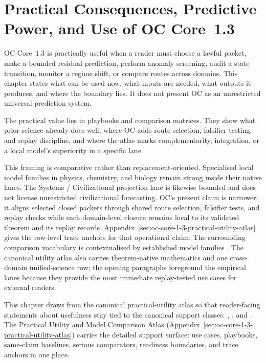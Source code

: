 \section{Practical Consequences, Predictive Power, and Use of OC Core~1.3}
\label{sec:oc-core-1-3-practical-utility}

OC Core~1.3 is practically useful when a reader must choose a lawful packet,
make a bounded residual prediction, perform anomaly screening, audit a state
transition, monitor a regime shift, or compare routes across domains. This
chapter states what can be used now, what inputs are needed, what outputs it
produces, and where the boundary lies. It does not present OC as an
unrestricted universal prediction system.

The practical value lies in playbooks and comparison matrices. They show what
prior science already does well, where OC adds route selection, falsifier
testing, and replay discipline, and where the atlas marks complementarity,
integration, or a local model's superiority in a specific lane.

This framing is comparative rather than replacement-oriented. Specialised
local model families in physics, chemistry, and biology remain strong inside
their native lanes. The Systems / Civilizational projection lane is likewise
bounded and does not license unrestricted civilizational forecasting. OC's
present claim is narrower: it aligns selected closed packets through shared
route selection, falsifier tests, and replay checks while each domain-level
closure remains local to its validated theorem and its replay records.
Appendix~\ref{sec:oc-core-1-3-practical-utility-atlas} gives the row-level
trace anchors for that operational claim. The surrounding comparison
vocabulary is contextualised by established model families
\parencite{goldenfeld_lectures,wilson_renormalization,kauffman_autocatalytic,raf_networks,hebb_organization,friston_free_energy}. The
canonical utility atlas also carries theorem-native mathematics and one
cross-domain unified-science row; the opening paragraphs foreground the
empirical lanes because they provide the most immediate replay-tested use cases
for external readers.

This chapter draws from the canonical practical-utility atlas so that
reader-facing statements about usefulness stay tied to the canonical support
classes: ,
, and
. The
Practical Utility and Model Comparison Atlas
(Appendix~\ref{sec:oc-core-1-3-practical-utility-atlas}) carries the detailed
support surface: use cases, playbooks, same-claim baselines, serious
comparators, readiness boundaries, and trace anchors in one place.


